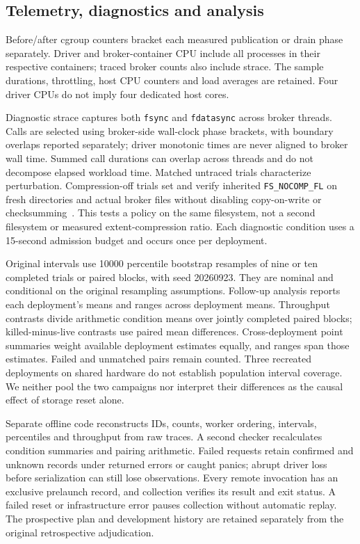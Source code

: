 \documentclass[11pt]{article}
\theoremstyle{definition}
\newcommand{\code}[1]{\texttt{#1}}
\begin{document}
\subsection{Telemetry, diagnostics and analysis}

Before/after cgroup counters bracket each measured publication or drain phase separately. Driver and broker-container CPU include all processes in their respective containers; traced broker counts also include strace. The sample durations, throttling, host CPU counters and load averages are retained. Four driver CPUs do not imply four dedicated host cores.

Diagnostic strace captures both \code{fsync} and \code{fdatasync} across broker threads. Calls are selected using broker-side wall-clock phase brackets, with boundary overlaps reported separately; driver monotonic times are never aligned to broker wall time. Summed call durations can overlap across threads and do not decompose elapsed workload time. Matched untraced trials characterize perturbation. Compression-off trials set and verify inherited \code{FS\_NOCOMP\_FL} on fresh directories and actual broker files without disabling copy-on-write or checksumming~\cite{btrfscompression,btrfsproperties,btrfsattributes}. This tests a policy on the same filesystem, not a second filesystem or measured extent-compression ratio. Each diagnostic condition uses a 15-second admission budget and occurs once per deployment.

Original intervals use 10000 percentile bootstrap resamples of nine or ten completed trials or paired blocks, with seed 20260923. They are nominal and conditional on the original resampling assumptions. Follow-up analysis reports each deployment's means and ranges across deployment means. Throughput contrasts divide arithmetic condition means over jointly completed paired blocks; killed-minus-live contrasts use paired mean differences. Cross-deployment point summaries weight available deployment estimates equally, and ranges span those estimates. Failed and unmatched pairs remain counted. Three recreated deployments on shared hardware do not establish population interval coverage. We neither pool the two campaigns nor interpret their differences as the causal effect of storage reset alone.

Separate offline code reconstructs IDs, counts, worker ordering, intervals, percentiles and throughput from raw traces. A second checker recalculates condition summaries and pairing arithmetic. Failed requests retain confirmed and unknown records under returned errors or caught panics; abrupt driver loss before serialization can still lose observations. Every remote invocation has an exclusive prelaunch record, and collection verifies its result and exit status. A failed reset or infrastructure error pauses collection without automatic replay. The prospective plan and development history are retained separately from the original retrospective adjudication.
\end{document}
